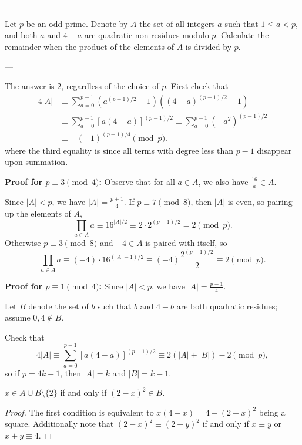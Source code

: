 
---

Let $p$ be an odd prime. Denote by $A$ the set of all integers $a$ such that $1\le a<p$, and both $a$ and $4-a$ are quadratic non-residues modulo $p$. Calculate the remainder when the product of the elements of $A$ is divided by $p$.

---

The answer is $2$, regardless of the choice of $p$.
First check that
\begin{align*}
    4|A|&\equiv\sum_{a=0}^{p-1}\left(a^{(p-1)/2}-1\right)\left( (4-a)^{(p-1)/2}-1\right)\\
    &\equiv\sum_{a=0}^{p-1}[a(4-a)]^{(p-1)/2}
    \equiv\sum_{a=0}^{p-1}\left(-a^2\right)^{(p-1)/2}\\
    &\equiv-(-1)^{(p-1)/4}\pmod p.
\end{align*}
where the third equality is since all terms with degree less than $p-1$ disappear upon summation.

\bigskip

\textbf{Proof for $p\equiv3\pmod4$:}
Observe that for all $a\in A$, we also have $\frac{16}a\in A$.

Since $|A|<p$, we have $|A|=\frac{p+1}4$. If $p\equiv7\pmod8$, then $|A|$ is even, so pairing up the elements of $A$, \[\prod_{a\in A}a\equiv16^{|A|/2}\equiv2\cdot2^{(p-1)/2}=2\pmod p.\]
Otherwise $p\equiv3\pmod8$ and $-4\in A$ is paired with itself, so \[\prod_{a\in A}a\equiv(-4)\cdot16^{(|A|-1)/2}\equiv(-4)\frac{2^{(p-1)/2}}2\equiv2\pmod p.\]

\bigskip

\textbf{Proof for $p\equiv1\pmod4$:}
Since $|A|<p$, we have $|A|=\frac{p-1}4$.

Let $B$ denote the set of $b$ such that $b$ and $4-b$ are both quadratic residues; assume $0,4\notin B$.

Check that
\[4|A|\equiv\sum_{a=0}^{p-1}[a(4-a)]^{(p-1)/2}\equiv2(|A|+|B|)-2\pmod p,\]
so if $p=4k+1$, then $|A|=k$ and $|B|=k-1$.
\begin{claim*}
    $x\in A\cup B\setminus\{2\}$ if and only if $(2-x)^2\in B$.
\end{claim*}
\begin{proof}
    The first condition is equivalent to $x(4-x)=4-(2-x)^2$ being a square. Additionally note that $(2-x)^2\equiv(2-y)^2$ if and only if $x\equiv y$ or $x+y\equiv4$.
\end{proof}

